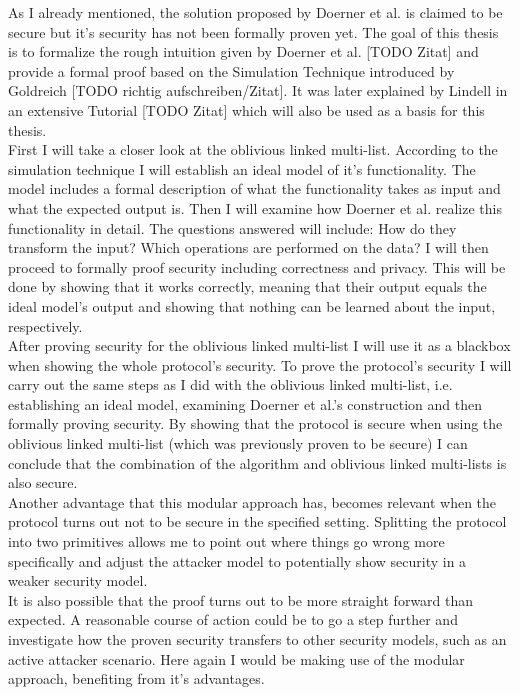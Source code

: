 As I already mentioned, the solution proposed by Doerner et al. is claimed to be secure but it's security has not been formally proven yet. The goal of this thesis is to formalize the rough intuition given by Doerner et al. [TODO Zitat] and provide a formal proof based on the Simulation Technique introduced by Goldreich [TODO richtig aufschreiben/Zitat]. It was later explained by Lindell in an extensive Tutorial [TODO Zitat] which will also be used as a basis for this thesis.\\
First I will take a closer look at the oblivious linked multi-list. According to the simulation technique I will establish an ideal model of it's functionality. The model includes a formal description of what the functionality takes as input and what the expected output is. Then I will examine how Doerner et al. realize this functionality in detail. The questions answered will include: How do they transform the input? Which operations are performed on the data? I will then proceed to formally proof security including correctness and privacy. This will be done by showing that it works correctly, meaning that their output equals the ideal model's output and showing that nothing can be learned about the input, respectively.\\
After proving security for the oblivious linked multi-list I will use it as a blackbox when showing the whole protocol's security. To prove the protocol's security I will carry out the same steps as I did with the oblivious linked multi-list, i.e. establishing an ideal model, examining Doerner et al.'s construction and then formally proving security. By showing that the protocol is secure when using the oblivious linked multi-list (which was previously proven to be secure) I can conclude that the combination of the algorithm and oblivious linked multi-lists is also secure.\\
Another advantage that this modular approach has, becomes relevant when the protocol turns out not to be secure in the specified setting. Splitting the protocol into two primitives allows me to point out where things go wrong more specifically and adjust the attacker model to potentially show security in a weaker security model.\\
It is also possible that the proof turns out to be more straight forward than expected. A reasonable course of action could be to go a step further and investigate how the proven security transfers to other security models, such as an active attacker scenario. Here again I would be making use of the modular approach, benefiting from it's advantages.\\